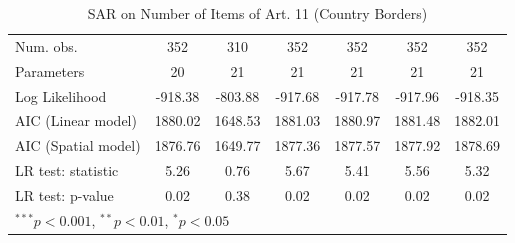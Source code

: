 \begin{table}[!h]
\begin{center}
\begin{tabular}{l c c c c c c }
Num. obs.               & 352           & 310          & 352           & 352           & 352           & 352           \\
Parameters              & 20            & 21           & 21            & 21            & 21            & 21            \\
Log Likelihood          & -918.38       & -803.88      & -917.68       & -917.78       & -917.96       & -918.35       \\
AIC (Linear model)      & 1880.02       & 1648.53      & 1881.03       & 1880.97       & 1881.48       & 1882.01       \\
AIC (Spatial model)     & 1876.76       & 1649.77      & 1877.36       & 1877.57       & 1877.92       & 1878.69       \\
LR test: statistic      & 5.26          & 0.76         & 5.67          & 5.41          & 5.56          & 5.32          \\
LR test: p-value        & 0.02          & 0.38         & 0.02          & 0.02          & 0.02          & 0.02          \\
\bottomrule
\multicolumn{7}{l}{\scriptsize{$^{***}p<0.001$, $^{**}p<0.01$, $^*p<0.05$}}
\end{tabular}
\caption{SAR on Number of Items of Art. 11 (Country Borders)}
\label{table:coefficients}
\end{center}
\end{table}
